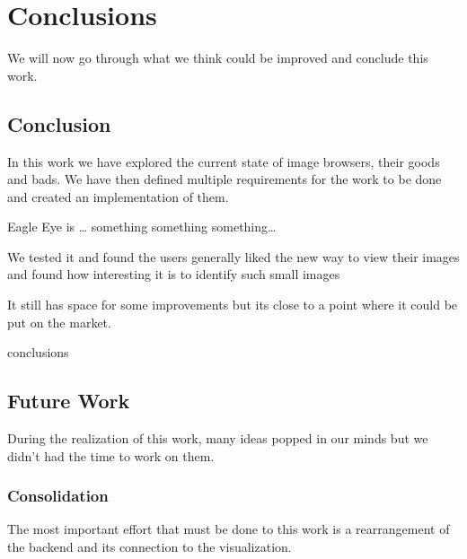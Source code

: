 \chapter{Conclusions}
\label{chapter:conclusions}

We will now go through what we think could be improved and conclude this work.



\section{Conclusion} %
\label{sec:conclusion}

In this work we have explored the current state of image browsers, their goods and bads. We have then defined multiple requirements for the work to be done and created an implementation of them.

Eagle Eye is … something something something…

We tested it and found the users generally liked the new way to view their images and found how interesting it is to identify such small images

It still has space for some improvements but its close to a point where it could be put on the market. 



conclusions






\section{Future Work} %
\label{future_work}

During the realization of this work, many ideas popped in our minds but we didn't had the time to work on them.

\subsection{Consolidation} %
\label{sec:consolidation}

The most important effort that must be done to this work is a rearrangement of the backend and its connection to the visualization.

